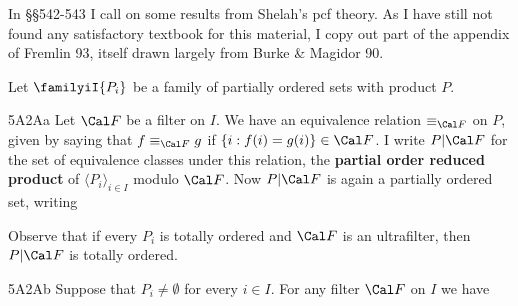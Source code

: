 
\def\chaptername{Appendix}
\def\sectionname{Pcf theory}


In \S\S542-543 I call on some results from Shelah's pcf theory.   As
I have still not found any satisfactory textbook for this material, I copy out
part of the appendix of {\smc Fremlin 93}, itself drawn largely from
{\smc Burke \& Magidor 90}.

   Let
$\familyiI{P_i}$ be a family of partially ordered sets with product
$P$.

\spheader 5A2Aa Let $\Cal F$ be a filter on $I$.   We have an equivalence
relation $\equiv_{\Cal F}$ on $P$, given by saying that
$f\equiv_{\Cal F}g$ if $\{i:f(i)=g(i)\}\in \Cal F$.   I write
$P|\Cal F$
for the set of equivalence classes under this relation, the
{\bf partial order reduced product} of $\langle P_i\rangle_{i\in I}$ modulo
$\Cal F$.   Now $P|\Cal F$ is again a partially ordered set, writing


\noindent Observe that if every $P_i$ is totally ordered and $\Cal F$
is an ultrafilter, then $P|\Cal F$ is totally ordered.

\spheader 5A2Ab Suppose that $P_i\ne\emptyset$ for every $i\in I$.
For any filter $\Cal F$ on $I$ we have




\noindent{}

